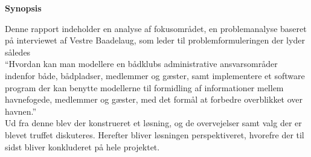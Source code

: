 \begin{center}\textbf{Synopsis}\\ \end{center}

Denne rapport indeholder en analyse af fokusområdet, en problemanalyse baseret på interviewet af Vestre Baadelaug, som leder til problemformuleringen der lyder således\\ 

\enquote{Hvordan kan man modellere en bådklubs administrative ansvarsområder indenfor både, bådpladser, medlemmer og gæster, samt implementere et software program der kan benytte modellerne til formidling af informationer mellem havnefogede, medlemmer og gæster, med det formål at forbedre overblikket over havnen.}\\
	
Ud fra denne blev der konstrueret et løsning, og de overvejelser samt valg der er blevet truffet diskuteres. Herefter bliver løsningen perspektiveret, hvorefre der til sidst bliver konkluderet på hele projektet.	



